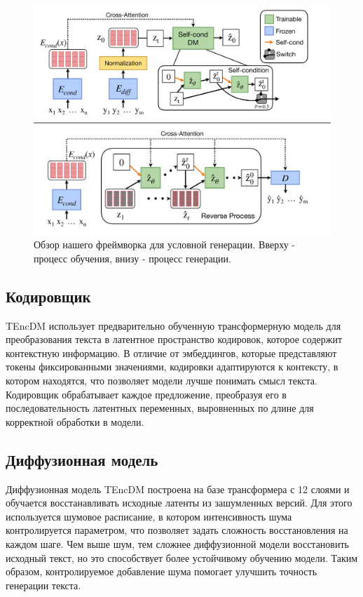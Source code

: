 \documentclass[a4paper, 12pt]{article}
\begin{document}
\begin{figure}[t]
\begin{center}
\centerline{\includegraphics[width=\columnwidth]{images/framework.pdf}}
\caption{Обзор нашего фреймворка для условной генерации. Вверху - процесс обучения, внизу - процесс генерации.}
\label{fig::model_pipeline}
\end{center}
\end{figure}

\subsection{Кодировщик}
TEncDM использует предварительно обученную трансформерную модель для преобразования текста в латентное пространство кодировок, которое содержит контекстную информацию. В отличие от эмбеддингов, которые представляют токены фиксированными значениями, кодировки адаптируются к контексту, в котором находятся, что позволяет модели лучше понимать смысл текста. Кодировщик обрабатывает каждое предложение, преобразуя его в последовательность латентных переменных, выровненных по длине для корректной обработки в модели.

\subsection{Диффузионная модель}
Диффузионная модель TEncDM построена на базе трансформера с 12 слоями и обучается восстанавливать исходные латенты из зашумленных версий. Для этого используется шумовое расписание, в котором интенсивность шума контролируется параметром, что позволяет задать сложность восстановления на каждом шаге. Чем выше шум, тем сложнее диффузионной модели восстановить исходный текст, но это способствует более устойчивому обучению модели. Таким образом, контролируемое добавление шума помогает улучшить точность генерации текста.
\end{document}
